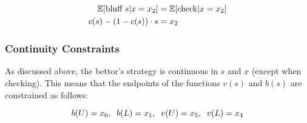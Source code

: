 \documentclass[../../main/main.tex]{subfiles}
\begin{document}
\begin{align}{\label{bluffindiff}}
    \nonumber \mathbb{E}[\text{bluff } s | x=x_2] & = \mathbb{E}[\text{check} | x=x_2]\\ 
    c(s) - (1-c(s)) \cdot s & = x_2
\end{align}

\subsubsection{Continuity Constraints}

As discussed above, the bettor's strategy is continuous in $s$ and $x$ (except when checking). This means that the endpoints of the functions $v(s)$ and $b(s)$ are constrained as follows:

\begin{equation}{\label{continuityconstraints}}
	 b(U) = x_0, \;\; b(L) = x_1, \;\; v(U) = x_5, \;\; v(L) = x_4
\end{equation}
\end{document}
